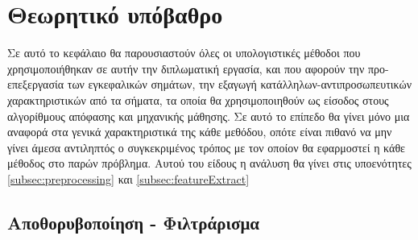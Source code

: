\documentclass[11pt,a4paper,english,greek,twoside]{../Thesis}
\begin{document}
\chapter{Θεωρητικό υπόβαθρο}\label{chap:Background}
\par Σε αυτό το κεφάλαιο θα παρουσιαστούν όλες οι υπολογιστικές μέθοδοι που χρησιμοποιήθηκαν σε αυτήν την διπλωματική εργασία, και που αφορούν την προ-επεξεργασία των εγκεφαλικών σημάτων, την εξαγωγή κατάλληλων-αντιπροσωπευτικών χαρακτηριστικών από τα σήματα, τα οποία θα χρησιμοποιηθούν ως είσοδος στους αλγορίθμους απόφασης και μηχανικής μάθησης. Σε αυτό το επίπεδο θα γίνει μόνο μια αναφορά στα γενικά χαρακτηριστικά της κάθε μεθόδου, οπότε είναι πιθανό να μην γίνει άμεσα αντιληπτός ο συγκεκριμένος τρόπος με τον οποίον θα εφαρμοστεί η κάθε μέθοδος στο παρών πρόβλημα. Αυτού του είδους η ανάλυση θα γίνει στις υποενότητες \ref{subsec:preprocessing} και \ref{subsec:featureExtract}
\section{Αποθορυβοποίηση - Φιλτράρισμα}
\end{document}
